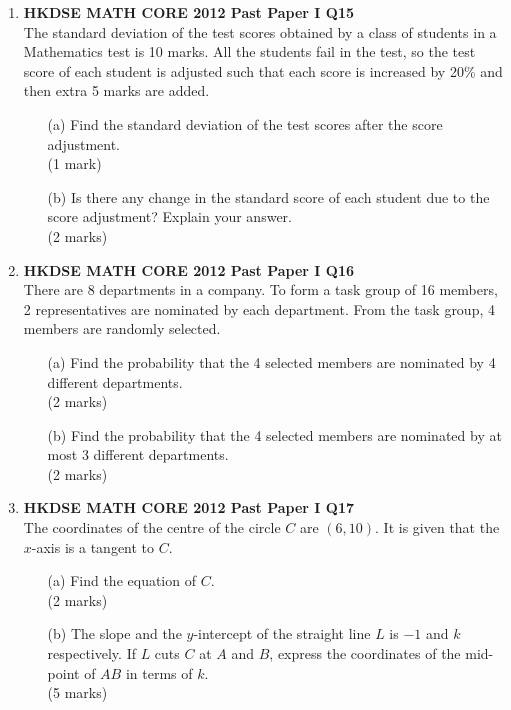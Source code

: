 \documentclass[12pt]{article}
\begin{document}
\begin{enumerate}
	\item \textbf{HKDSE MATH CORE 2012 Past Paper I Q15}\\
	The standard deviation of the test scores obtained by a class of students in a Mathematics test is 10 marks. All the students fail in the test, so the test score of each student is adjusted such that each score is increased by 20\% and then extra 5 marks are added.
	\begin{enumerate}
		\item[(a)] Find the standard deviation of the test scores after the score adjustment. \\(1 mark)
		\item[(b)] Is there any change in the standard score of each student due to the score adjustment? Explain your answer. \\(2 marks)
	\end{enumerate}
	
	\item \textbf{HKDSE MATH CORE 2012 Past Paper I Q16}\\
	There are 8 departments in a company. To form a task group of 16 members, 2 representatives are nominated by each department. From the task group, 4 members are randomly selected.
	\begin{enumerate}
		\item[(a)] Find the probability that the 4 selected members are nominated by 4 different departments. \\(2 marks)
		\item[(b)] Find the probability that the 4 selected members are nominated by at most 3 different departments. \\(2 marks)
	\end{enumerate}

	\item \textbf{HKDSE MATH CORE 2012 Past Paper I Q17}\\
	The coordinates of the centre of the circle $C$ are $(6, 10)$. It is given that the $x$-axis is a tangent to $C$.
	\begin{enumerate}
		\item[(a)] Find the equation of $C$. \\(2 marks)
		\item[(b)]The slope and the $y$-intercept of the straight line $L$ is $-1$ and $k$ respectively. If $L$ cuts $C$ at $A$ and $B$, express the coordinates of the mid-point of $AB$ in terms of $k$. \\(5 marks)
	\end{enumerate}


\end{enumerate}
\end{document}
